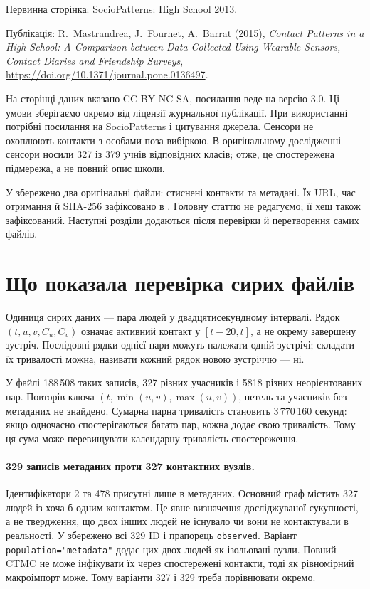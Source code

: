 \documentclass[11pt,a4paper]{article}
\begin{document}
Первинна сторінка: \href{https://sociopatterns.org/datasets/high-school-contact-and-friendship-networks/}{SocioPatterns: High School 2013}.

Публікація: R.~Mastrandrea, J.~Fournet, A.~Barrat (2015), \emph{Contact Patterns in a High School: A Comparison between Data Collected Using Wearable Sensors, Contact Diaries and Friendship Surveys}, \url{https://doi.org/10.1371/journal.pone.0136497}.

На сторінці даних вказано CC BY-NC-SA, посилання веде на версію 3.0. Ці умови зберігаємо окремо від ліцензії журнальної публікації. При використанні потрібні посилання на SocioPatterns і цитування джерела. Сенсори не охоплюють контакти з особами поза вибіркою. В оригінальному дослідженні сенсори носили 327 із 379 учнів відповідних класів; отже, це спостережена підмережа, а не повний опис школи.

У  збережено два оригінальні файли: стиснені контакти та метадані. Їх URL, час отримання й SHA-256 зафіксовано в . Головну статтю не редагуємо; її хеш також зафіксований. Наступні розділи додаються після перевірки й перетворення самих файлів.


\section{Що показала перевірка сирих файлів}
Одиниця сирих даних --- пара людей у двадцятисекундному інтервалі. Рядок $(t,u,v,C_u,C_v)$ означає активний контакт у $[t-20,t]$, а не окрему завершену зустріч. Послідовні рядки однієї пари можуть належати одній зустрічі; складати їх тривалості можна, називати кожний рядок новою зустріччю --- ні.

У файлі 188\,508 таких записів, 327 різних учасників і 5818 різних неорієнтованих пар. Повторів ключа $(t,\min(u,v),\max(u,v))$, петель та учасників без метаданих не знайдено. Сумарна парна тривалість становить 3\,770\,160 секунд: якщо одночасно спостерігаються багато пар, кожна додає свою тривалість. Тому ця сума може перевищувати календарну тривалість спостереження.

\paragraph{329 записів метаданих проти 327 контактних вузлів.}
Ідентифікатори 2 та 478 присутні лише в метаданих. Основний граф містить 327 людей із хоча б одним контактом. Це явне визначення досліджуваної сукупності, а не твердження, що двох інших людей не існувало чи вони не контактували в реальності. У  збережено всі 329 ID і прапорець \texttt{observed}. Варіант \texttt{population="metadata"} додає цих двох людей як ізольовані вузли. Повний CTMC не може інфікувати їх через спостережені контакти, тоді як рівномірний макроімпорт може. Тому варіанти 327 і 329 треба порівнювати окремо.
\end{document}
